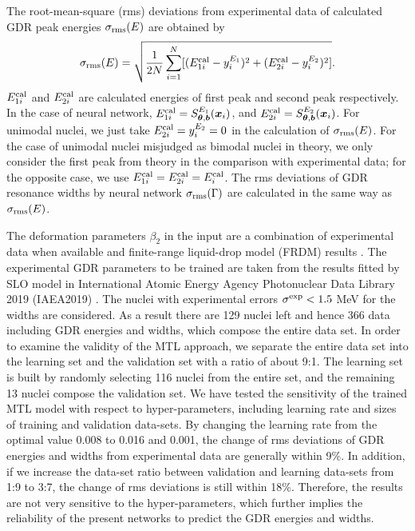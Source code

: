 \documentclass[twocolumn,showpacs,superscriptaddress,amsmath,amssymb,prc,preprintnumbers]{revtex4-1}
\begin{document}
The root-mean-square (rms) deviations from experimental data of calculated GDR peak energies  $\sigma_{\rm rms}(E)$ are obtained by
\begin{align}
\sigma_{\rm rms}(E) =   \sqrt{ \frac{1}{2N} \sum_{i=1}^N  [ (E_{1i}^{ \rm cal}- y^{E_1}_{i})^2  +  (E_{2i}^{ \rm cal} - y^{E_2}_{i})^2 ] }. \label{align:align13}
\end{align}
$E_{1i}^{ \rm cal}$ and $E_{2i}^{ \rm cal}$ are calculated energies of first peak and second peak respectively. In the case of neural network, $E_{1i}^{ \rm cal} = S^{E_1}_{\boldsymbol{\theta},\boldsymbol{b}}(\boldsymbol{x}_i)$, and  $E_{2i}^{ \rm cal} = S^{E_2}_{\boldsymbol{\theta},\boldsymbol{b}}(\boldsymbol{x}_i)$.
For unimodal nuclei, we just take $E_{2i}^{ \rm cal} =  y^{E_2}_{i}= 0$ in the calculation of $\sigma_{\rm rms}(E)$. For the case of unimodal nuclei misjudged as bimodal nuclei in theory, we only consider the first peak from theory in the comparison with experimental data; for the opposite case, we use $E_{1i}^{ \rm cal}=E_{2i}^{ \rm cal}=E_{i}^{ \rm cal}$.   The rms deviations of GDR resonance widths by neural network $\sigma_{\rm rms}(\Gamma)$  are calculated in the same way as $\sigma_{\rm rms}(E)$.


The deformation parameters $\beta_2$ in the input are a combination of experimental data \cite{RIPL2} when available and finite-range liquid-drop model (FRDM) results \cite{Moller2016}.
The experimental GDR parameters to be trained are taken from the results fitted by SLO model in International Atomic Energy Agency Photonuclear Data Library 2019
(IAEA2019) \cite{Kawano2020109,Plujko2018}. The nuclei with experimental errors $\sigma ^{\rm exp} < 1.5$ MeV  for the widths are considered.
As a result there are 129 nuclei left and hence 366 data including GDR energies and widths, which compose the entire data set.
In order to examine the validity of the MTL approach, we separate the entire data set into the learning set and the validation set with a ratio of about 9:1.
The learning set is built by randomly selecting 116 nuclei from the entire set, and the remaining 13 nuclei compose the validation set.
We have tested the sensitivity of the trained MTL model with respect to hyper-parameters, including learning rate and sizes of training and validation data-sets. By changing the learning rate from the optimal value 0.008 to 0.016 and 0.001, the change of rms deviations of GDR energies and widths from experimental data are generally within 9\%. In addition, if we increase the data-set ratio between validation and learning data-sets from 1:9 to 3:7, the change of rms deviations is still within 18\%. Therefore, the results are not very sensitive to the hyper-parameters, which further implies the reliability of the present networks to predict the GDR energies and widths.
\end{document}
